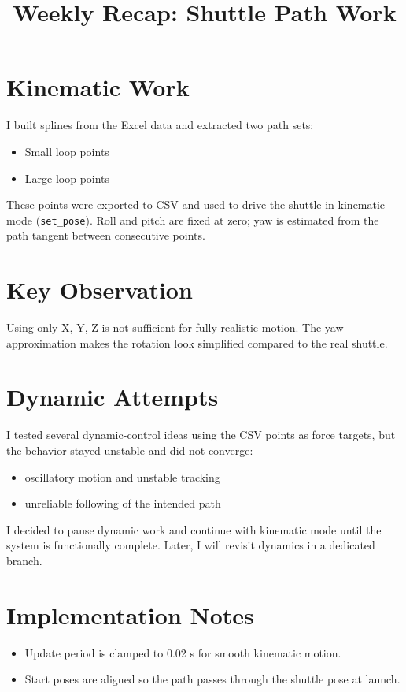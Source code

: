 \documentclass[11pt]{article}
\title{Weekly Recap: Shuttle Path Work}
\author{}
\date{}
\begin{document}
\maketitle

\section*{Kinematic Work}
I built splines from the Excel data and extracted two path sets:
\begin{itemize}
  \item Small loop points
  \item Large loop points
\end{itemize}
These points were exported to CSV and used to drive the shuttle in kinematic mode
(\texttt{set\_pose}). Roll and pitch are fixed at zero; yaw is estimated from the path tangent
between consecutive points.

\section*{Key Observation}
Using only X, Y, Z is not sufficient for fully realistic motion. The yaw approximation
makes the rotation look simplified compared to the real shuttle.

\section*{Dynamic Attempts}
I tested several dynamic-control ideas using the CSV points as force targets, but the
behavior stayed unstable and did not converge:
\begin{itemize}
  \item oscillatory motion and unstable tracking
  \item unreliable following of the intended path
\end{itemize}
I decided to pause dynamic work and continue with kinematic mode until the system is
functionally complete. Later, I will revisit dynamics in a dedicated branch.

\section*{Implementation Notes}
\begin{itemize}
  \item Update period is clamped to 0.02 s for smooth kinematic motion.
  \item Start poses are aligned so the path passes through the shuttle pose at launch.
\end{itemize}
\end{document}
